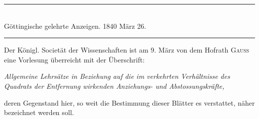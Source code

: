 \clearpage
{}
\GaussVSourceUnnumbered
{}
\begin{center}
\rule{.70\linewidth}{.4pt}\\[.7\baselineskip]
Göttingische gelehrte Anzeigen. 1840 März 26.\\[.7\baselineskip]
\rule{.70\linewidth}{.4pt}
\end{center}

Der Königl. Societät der Wissenschaften ist am 9. März von dem Hofrath
\textsc{Gauss} eine Vorlesung überreicht mit der Überschrift:
\begin{center}
\textit{Allgemeine Lehrsätze in Beziehung auf die im verkehrten Verhältnisse des Quadrats
der Entfernung wirkenden Anziehungs- und Abstossungskräfte,}
\end{center}
\noindent
deren Gegenstand hier, so weit die Bestimmung dieser Blätter es verstattet, näher
bezeichnet werden soll.

